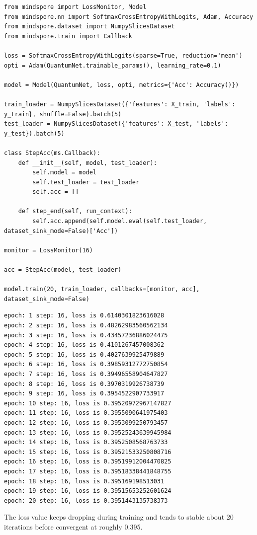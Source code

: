\begin{lstlisting}
from mindspore import LossMonitor, Model
from mindspore.nn import SoftmaxCrossEntropyWithLogits, Adam, Accuracy
from mindspore.dataset import NumpySlicesDataset
from mindspore.train import Callback

loss = SoftmaxCrossEntropyWithLogits(sparse=True, reduction='mean')
opti = Adam(QuantumNet.trainable_params(), learning_rate=0.1)

model = Model(QuantumNet, loss, opti, metrics={'Acc': Accuracy()})

train_loader = NumpySlicesDataset({'features': X_train, 'labels': y_train}, shuffle=False).batch(5)
test_loader = NumpySlicesDataset({'features': X_test, 'labels': y_test}).batch(5)

class StepAcc(ms.Callback):
    def __init__(self, model, test_loader):
        self.model = model
        self.test_loader = test_loader
        self.acc = []

    def step_end(self, run_context):
        self.acc.append(self.model.eval(self.test_loader, dataset_sink_mode=False)['Acc'])

monitor = LossMonitor(16)

acc = StepAcc(model, test_loader)

model.train(20, train_loader, callbacks=[monitor, acc], dataset_sink_mode=False)
\end{lstlisting}

\begin{lstlisting}
epoch: 1 step: 16, loss is 0.6140301823616028
epoch: 2 step: 16, loss is 0.48262983560562134
epoch: 3 step: 16, loss is 0.43457236886024475
epoch: 4 step: 16, loss is 0.4101267457008362
epoch: 5 step: 16, loss is 0.4027639925479889
epoch: 6 step: 16, loss is 0.39859312772750854
epoch: 7 step: 16, loss is 0.39496558904647827
epoch: 8 step: 16, loss is 0.3970319926738739
epoch: 9 step: 16, loss is 0.3954522907733917
epoch: 10 step: 16, loss is 0.39520972967147827
epoch: 11 step: 16, loss is 0.3955090641975403
epoch: 12 step: 16, loss is 0.3953099250793457
epoch: 13 step: 16, loss is 0.39525243639945984
epoch: 14 step: 16, loss is 0.3952508568763733
epoch: 15 step: 16, loss is 0.39521533250808716
epoch: 16 step: 16, loss is 0.39519912004470825
epoch: 17 step: 16, loss is 0.39518338441848755
epoch: 18 step: 16, loss is 0.395169198513031
epoch: 19 step: 16, loss is 0.39515653252601624
epoch: 20 step: 16, loss is 0.3951443135738373
\end{lstlisting}

The loss value keeps dropping during training and tends to stable about 20 iterations before convergent at roughly 0.395.

